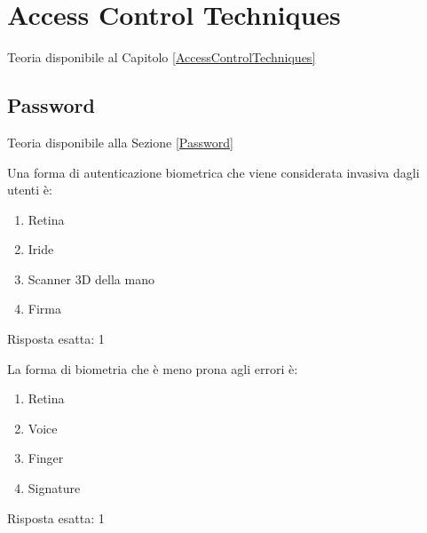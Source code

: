 \chapter{Access Control Techniques}

Teoria disponibile al Capitolo \ref{AccessControlTechniques}

\section{Password}
\label{EsPass}

Teoria disponibile alla Sezione \ref{Password}


\begin{Exercise} [
  title={Domanda},
  label={pass1}
 ]

 \Question Una forma di autenticazione biometrica che viene considerata
invasiva dagli utenti è:
\begin{enumerate}
 \item Retina
 \item Iride
 \item Scanner 3D della mano
 \item Firma
\end{enumerate}

\end{Exercise}


\begin{Answer} [
  ref={pass1},
  number={1}
  ]

  \Question Risposta esatta: 1

\end{Answer}


\begin{Exercise} [
  title={Domanda},
  label={pass2}
 ]

 \Question La forma di biometria che è meno prona agli errori è:
\begin{enumerate}
\item Retina
\item Voice
\item Finger
\item Signature
\end{enumerate}


\end{Exercise}


\begin{Answer} [
  ref={pass2},
  number={2}
  ]

  \Question Risposta esatta: 1

\end{Answer}

